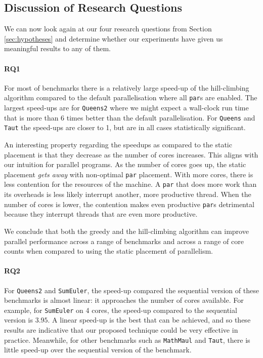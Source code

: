 \subsection{Discussion of Research Questions}

We can now look again at our four research questions from Section
\ref{sec:hypotheses} and determine whether our experiments have given us
meaningful results to any of them.

\paragraph{RQ1}
For most of benchmarks there is a relatively large speed-up of the
hill-climbing algorithm compared to the default parallelisation where all
\verb-par-s are enabled.  The largest speed-ups are for \verb|Queens2| where we
might expect a wall-clock run time that is more than 6 times better than the
default parallelisation.  For \verb|Queens| and \verb|Taut| the speed-ups are
closer to 1, but are in all cases statistically significant.

An interesting property regarding the speedups as compared to the static
placement is that they decrease as the number of cores increases.  This aligns
with our intuition for parallel programs. As the number of cores goes up, the
static placement \emph{gets away} with non-optimal \verb|par| placement. With
more cores, there is less contention for the resources of the machine. A
\verb|par| that does more work than its overheads is less likely interrupt
another, more productive thread. When the number of cores is lower, the
contention makes even productive \verb|par|s detrimental because they interrupt
threads that are even more productive.

We conclude that both the greedy and the hill-climbing algorithm can improve
parallel performance across a range of benchmarks and across a range of core
counts when compared to using the static placement of parallelism.

\paragraph{RQ2}
For \verb|Queens2| and \verb|SumEuler|, the speed-up compared the sequential
version of these benchmarks is almost linear: it approaches the number of cores
available.  For example, for \verb|SumEuler| on 4 cores, the speed-up compared
to the sequential version is $3.95$.  A linear speed-up is the best that can be
achieved, and so these results are indicative that our proposed technique could
be very effective in practice.  Meanwhile, for other benchmarks such as
\verb|MathMaul| and \verb|Taut|, there is little speed-up over the sequential
version of the benchmark.

